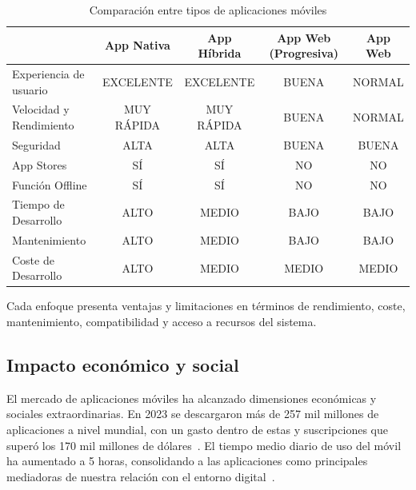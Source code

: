 \begin{table}[htbp]
\centering
\renewcommand{\arraystretch}{1.5}
\begin{tabularx}{\textwidth}{|X|c|c|c|c|}
\hline
\textbf{} & \textbf{App Nativa} & \textbf{App Híbrida} & \textbf{App Web (Progresiva)} & \textbf{App Web} \\
\hline
Experiencia de usuario & \textcolor{verde}{EXCELENTE} & \textcolor{verde}{EXCELENTE} & \textcolor{marron}{BUENA} & \textcolor{rojo}{NORMAL} \\
\hline
Velocidad y Rendimiento & \textcolor{verde}{MUY RÁPIDA} & \textcolor{verde}{MUY RÁPIDA} & \textcolor{marron}{BUENA} & \textcolor{rojo}{NORMAL} \\
\hline
Seguridad & \textcolor{verde}{ALTA} & \textcolor{verde}{ALTA} & \textcolor{marron}{BUENA} & \textcolor{marron}{BUENA} \\
\hline
App Stores & \textcolor{verde}{SÍ} & \textcolor{verde}{SÍ} & \textcolor{rojo}{NO} & \textcolor{rojo}{NO} \\
\hline
Función Offline & \textcolor{verde}{SÍ} & \textcolor{verde}{SÍ} & \textcolor{rojo}{NO} & \textcolor{rojo}{NO} \\
\hline
Tiempo de Desarrollo & \textcolor{rojo}{ALTO} & \textcolor{marron}{MEDIO} & \textcolor{verde}{BAJO} & \textcolor{verde}{BAJO} \\
\hline
Mantenimiento & \textcolor{rojo}{ALTO} & \textcolor{marron}{MEDIO} & \textcolor{verde}{BAJO} & \textcolor{verde}{BAJO} \\
\hline
Coste de Desarrollo & \textcolor{rojo}{ALTO} & \textcolor{marron}{MEDIO} & \textcolor{marron}{MEDIO} & \textcolor{marron}{MEDIO} \\
\hline
\end{tabularx}
\caption{Comparación entre tipos de aplicaciones móviles}
\end{table}

\vspace{1em}

Cada enfoque presenta ventajas y limitaciones en términos de rendimiento, coste, mantenimiento, compatibilidad y acceso a recursos del sistema.

\subsection{Impacto económico y social}

El mercado de aplicaciones móviles ha alcanzado dimensiones económicas y sociales extraordinarias. En 2023 se descargaron más de 257 mil millones de aplicaciones a nivel mundial, con un gasto dentro de estas y suscripciones que superó los 170 mil millones de dólares~\cite{dataai2023}. El tiempo medio diario de uso del móvil ha aumentado a 5 horas, consolidando a las aplicaciones como principales mediadoras de nuestra relación con el entorno digital~\cite{appannie2022}.


